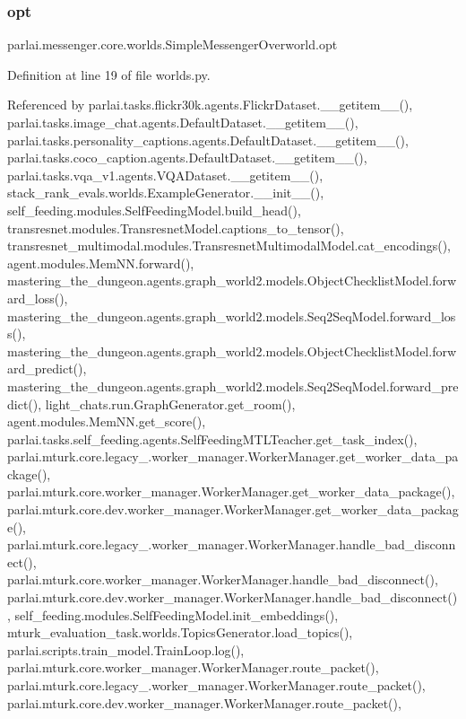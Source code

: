 \subsubsection{\texorpdfstring{opt}{opt}}
{\footnotesize\ttfamily parlai.\+messenger.\+core.\+worlds.\+Simple\+Messenger\+Overworld.\+opt}



Definition at line 19 of file worlds.\+py.



Referenced by parlai.\+tasks.\+flickr30k.\+agents.\+Flickr\+Dataset.\+\_\+\+\_\+getitem\+\_\+\+\_\+(), parlai.\+tasks.\+image\+\_\+chat.\+agents.\+Default\+Dataset.\+\_\+\+\_\+getitem\+\_\+\+\_\+(), parlai.\+tasks.\+personality\+\_\+captions.\+agents.\+Default\+Dataset.\+\_\+\+\_\+getitem\+\_\+\+\_\+(), parlai.\+tasks.\+coco\+\_\+caption.\+agents.\+Default\+Dataset.\+\_\+\+\_\+getitem\+\_\+\+\_\+(), parlai.\+tasks.\+vqa\+\_\+v1.\+agents.\+V\+Q\+A\+Dataset.\+\_\+\+\_\+getitem\+\_\+\+\_\+(), stack\+\_\+rank\+\_\+evals.\+worlds.\+Example\+Generator.\+\_\+\+\_\+init\+\_\+\+\_\+(), self\+\_\+feeding.\+modules.\+Self\+Feeding\+Model.\+build\+\_\+head(), transresnet.\+modules.\+Transresnet\+Model.\+captions\+\_\+to\+\_\+tensor(), transresnet\+\_\+multimodal.\+modules.\+Transresnet\+Multimodal\+Model.\+cat\+\_\+encodings(), agent.\+modules.\+Mem\+N\+N.\+forward(), mastering\+\_\+the\+\_\+dungeon.\+agents.\+graph\+\_\+world2.\+models.\+Object\+Checklist\+Model.\+forward\+\_\+loss(), mastering\+\_\+the\+\_\+dungeon.\+agents.\+graph\+\_\+world2.\+models.\+Seq2\+Seq\+Model.\+forward\+\_\+loss(), mastering\+\_\+the\+\_\+dungeon.\+agents.\+graph\+\_\+world2.\+models.\+Object\+Checklist\+Model.\+forward\+\_\+predict(), mastering\+\_\+the\+\_\+dungeon.\+agents.\+graph\+\_\+world2.\+models.\+Seq2\+Seq\+Model.\+forward\+\_\+predict(), light\+\_\+chats.\+run.\+Graph\+Generator.\+get\+\_\+room(), agent.\+modules.\+Mem\+N\+N.\+get\+\_\+score(), parlai.\+tasks.\+self\+\_\+feeding.\+agents.\+Self\+Feeding\+M\+T\+L\+Teacher.\+get\+\_\+task\+\_\+index(), parlai.\+mturk.\+core.\+legacy\+\_.\+worker\+\_\+manager.\+Worker\+Manager.\+get\+\_\+worker\+\_\+data\+\_\+package(), parlai.\+mturk.\+core.\+worker\+\_\+manager.\+Worker\+Manager.\+get\+\_\+worker\+\_\+data\+\_\+package(), parlai.\+mturk.\+core.\+dev.\+worker\+\_\+manager.\+Worker\+Manager.\+get\+\_\+worker\+\_\+data\+\_\+package(), parlai.\+mturk.\+core.\+legacy\+\_.\+worker\+\_\+manager.\+Worker\+Manager.\+handle\+\_\+bad\+\_\+disconnect(), parlai.\+mturk.\+core.\+worker\+\_\+manager.\+Worker\+Manager.\+handle\+\_\+bad\+\_\+disconnect(), parlai.\+mturk.\+core.\+dev.\+worker\+\_\+manager.\+Worker\+Manager.\+handle\+\_\+bad\+\_\+disconnect(), self\+\_\+feeding.\+modules.\+Self\+Feeding\+Model.\+init\+\_\+embeddings(), mturk\+\_\+evaluation\+\_\+task.\+worlds.\+Topics\+Generator.\+load\+\_\+topics(), parlai.\+scripts.\+train\+\_\+model.\+Train\+Loop.\+log(), parlai.\+mturk.\+core.\+worker\+\_\+manager.\+Worker\+Manager.\+route\+\_\+packet(), parlai.\+mturk.\+core.\+legacy\+\_.\+worker\+\_\+manager.\+Worker\+Manager.\+route\+\_\+packet(), parlai.\+mturk.\+core.\+dev.\+worker\+\_\+manager.\+Worker\+Manager.\+route\+\_\+packet(), 